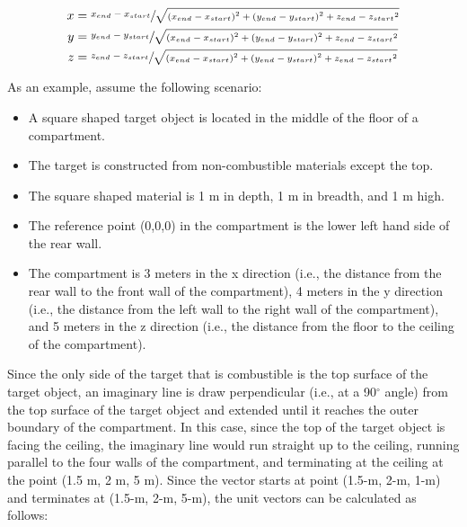 \begin{equation}
  \begin{aligned}
 x &= \sfrac{x_{end} - x_{start}}{\sqrt{{ \left( {x_{end} - x_{start}} \right) }^2 + { \left( {y_{end} - y_{start}} \right) }^2 + {z_{end} - z_{start}}^2}} \\
 y &= \sfrac{y_{end} - y_{start}}{\sqrt{{ \left( {x_{end} - x_{start}} \right) }^2 + { \left( {y_{end} - y_{start}} \right) }^2 + {z_{end} - z_{start}}^2}} \\
 z &= \sfrac{z_{end} - z_{start}}{\sqrt{{ \left( {x_{end} - x_{start}} \right) }^2 + { \left( {y_{end} - y_{start}} \right) }^2 + {z_{end} - z_{start}}^2}}
  \end{aligned}
\end{equation}

As an example, assume the following scenario:

\begin{itemize}
\item A square shaped target object is located in the middle of the floor of a compartment.
\item The target is constructed from non-combustible materials except the top.
\item The square shaped material is 1 m in depth, 1 m in breadth, and 1 m high.
\item The reference point (0,0,0) in the compartment is the lower left hand side of the rear wall.
\item The compartment is 3 meters in the x direction (i.e., the distance from the rear wall to the front wall of the compartment), 4 meters in the y direction (i.e., the distance from the left wall to the right wall of the compartment), and 5 meters in the z direction (i.e., the distance from the floor to the ceiling of the compartment).
\end{itemize}

Since the only side of the target that is combustible is the top surface of the target object, an imaginary line is draw perpendicular (i.e., at a 90$^\circ$ angle) from the top surface of the target object and extended until it reaches the outer boundary of the compartment.  In this case, since the top of the target object is facing the ceiling, the imaginary line would run straight up to the ceiling, running parallel to the four walls of the compartment, and terminating at the ceiling at the point (1.5 m, 2 m, 5 m).  Since the vector starts at point (1.5-m, 2-m, 1-m) and terminates at (1.5-m, 2-m, 5-m), the unit vectors can be calculated as follows:


